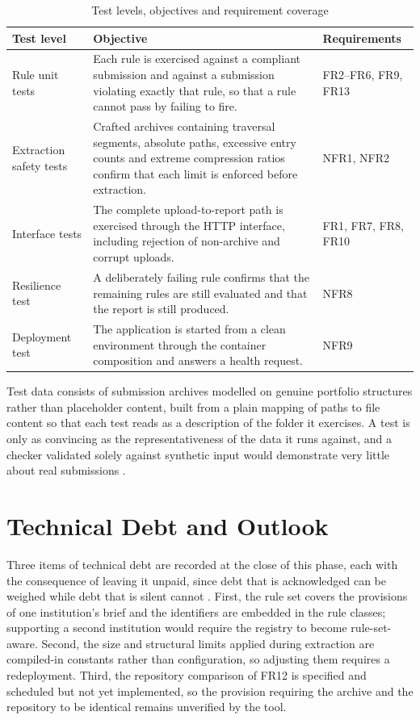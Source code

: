 \documentclass[a4paper,11pt]{article}
\begin{document}
\begin{table}[H]
\centering
\caption{Test levels, objectives and requirement coverage}
\label{tab:testing}
\footnotesize
\renewcommand{\arraystretch}{1.2}
\setlength{\tabcolsep}{4pt}
\begin{tabularx}{\textwidth}{|p{2.9cm}|X|p{2.6cm}|}
\hline
\rowcolor{gray!15}
\textbf{Test level} & \textbf{Objective} & \textbf{Requirements} \\
\hline
\hline
Rule unit tests & Each rule is exercised against a compliant submission and against a submission violating exactly that rule, so that a rule cannot pass by failing to fire. & FR2--FR6, FR9, FR13 \\
\hline
Extraction safety tests & Crafted archives containing traversal segments, absolute paths, excessive entry counts and extreme compression ratios confirm that each limit is enforced before extraction. & NFR1, NFR2 \\
\hline
Interface tests & The complete upload-to-report path is exercised through the HTTP interface, including rejection of non-archive and corrupt uploads. & FR1, FR7, FR8, FR10 \\
\hline
Resilience test & A deliberately failing rule confirms that the remaining rules are still evaluated and that the report is still produced. & NFR8 \\
\hline
Deployment test & The application is started from a clean environment through the container composition and answers a health request. & NFR9 \\
\hline
\end{tabularx}
\end{table}

Test data consists of submission archives modelled on genuine portfolio
structures rather than placeholder content, built from a plain mapping of paths
to file content so that each test reads as a description of the folder it
exercises. A test is only as convincing as the representativeness of the data it
runs against, and a checker validated solely against synthetic input would
demonstrate very little about real submissions \citep{Khorikov2020}.

\section{Technical Debt and Outlook}\label{sec:debt}

Three items of technical debt are recorded at the close of this phase, each with
the consequence of leaving it unpaid, since debt that is acknowledged can be
weighed while debt that is silent cannot \citep{Winters2020}. First, the rule
set covers the provisions of one institution's brief and the identifiers are
embedded in the rule classes; supporting a second institution would require the
registry to become rule-set-aware. Second, the size and structural limits applied
during extraction are compiled-in constants rather than configuration, so
adjusting them requires a redeployment. Third, the repository comparison of FR12
is specified and scheduled but not yet implemented, so the provision requiring
the archive and the repository to be identical remains unverified by the tool.
\end{document}
